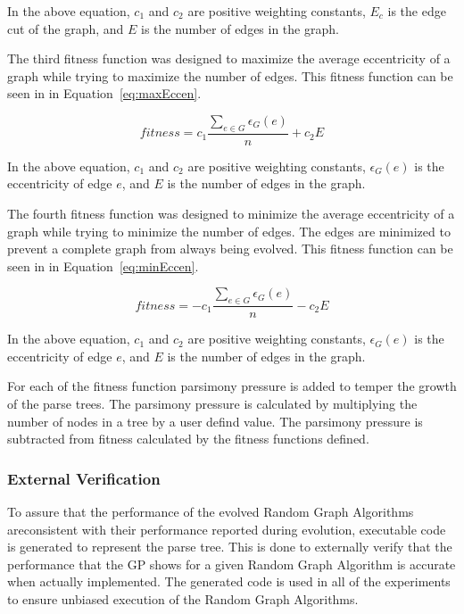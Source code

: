 \documentclass{article}
\begin{document}
In the above equation, $c_1$ and $c_2$ are positive weighting constants, $E_c$ is the edge cut of the graph, and $E$ is the number of edges in the graph.



The third fitness function was designed to maximize the average eccentricity of a graph while trying to maximize the number of edges. This fitness function
can be seen in in Equation~\ref{eq:maxEccen}.


\begin{equation}
\label{eq:maxEccen}
fitness = c_1\frac{\sum\limits_{e \in G}\epsilon_{G}(e)}{n} + c_2E
\end{equation}

In the above equation, $c_1$ and $c_2$ are positive weighting constants, $\epsilon_{G}(e)$ is the eccentricity of edge $e$, and $E$ is the number of edges in the graph.


The fourth fitness function was designed to minimize the average eccentricity of a graph while trying to minimize the number of edges. The edges are minimized to 
prevent a complete graph from always being evolved. This fitness function
can be seen in in Equation~\ref{eq:minEccen}.


\begin{equation}
\label{eq:minEccen}
fitness = -c_1\frac{\sum\limits_{e \in G}\epsilon_{G}(e)}{n} - c_2E
\end{equation}

In the above equation, $c_1$ and $c_2$ are positive weighting constants, $\epsilon_{G}(e)$ is the eccentricity of edge $e$, and $E$ is the number of edges in the graph.

For each of the fitness function parsimony pressure is added to temper the growth of the parse trees. The parsimony pressure is calculated by multiplying the number
of nodes in a tree by a user defind value. The parsimony pressure is subtracted from fitness calculated by the fitness functions defined.

\subsubsection{External Verification}
To assure that the performance of the evolved Random Graph Algorithms areconsistent with their performance reported during evolution,
executable code is generated to represent the parse tree. This is done to externally verify that the performance that the GP shows for a
given Random Graph Algorithm is accurate when actually implemented. The generated code is used in all of the experiments to ensure unbiased execution 
of the Random Graph Algorithms.
\end{document}
